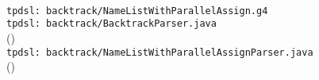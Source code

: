 \begin{frame}{}
  \begin{center}
	 \\[20pt]
	\texttt{tpdsl: backtrack/NameListWithParallelAssign.g4}  \\[40pt]
	\pause
	\texttt{tpdsl: backtrack/BacktrackParser.java}
	\\(\texttt{}) \\[30pt]
	\pause
	\texttt{tpdsl: backtrack/NameListWithParallelAssignParser.java}
	\\(\texttt{})

	\pause
	\vspace{20pt}
  \end{center}
\end{frame}
